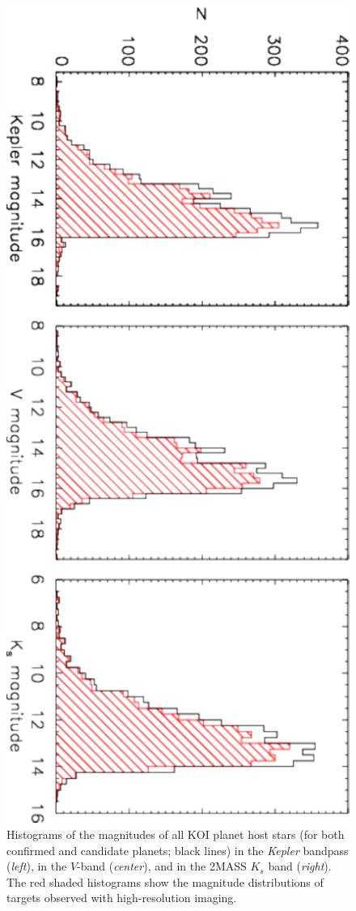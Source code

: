 \documentclass[twocolumn,appendixfloats]{aastex6}
\begin{document}
\begin{figure}[!t]
\centering
\includegraphics[angle=90, scale=0.61]{KOI_planets_V_Kepmag_Ks_histo}
\caption{Histograms of the magnitudes of all KOI planet host stars (for both
confirmed and candidate planets; black lines) in the {\it Kepler} bandpass 
({\it left}), in the $V$-band ({\it center}), and in the 2MASS $K_s$ band 
({\it right}). The red shaded histograms show the magnitude distributions 
of targets observed with high-resolution imaging.
\label{KOIs_mag_histo}}
\end{figure}
\end{document}
